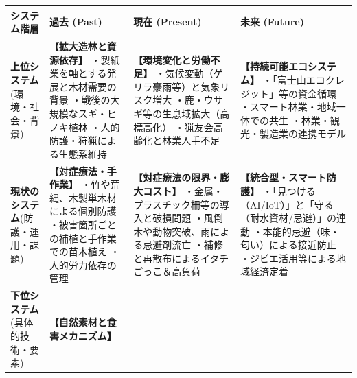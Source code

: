 \documentclass[uplatex, 11pt, a4paper]{bxjsarticle}
\begin{document}
\begin{table}[h]
\centering
\small
\renewcommand{\arraystretch}{1.4}
\begin{tabular}{|p{2.8cm}|p{4.2cm}|p{4.2cm}|p{4.2cm}|}
\hline
\rowcolor{primary}
\color{white}\textbf{システム階層} & \color{white}\textbf{過去 (Past)} & \color{white}\textbf{現在 (Present)} & \color{white}\textbf{未来 (Future)} \\ \hline
\rowcolor{bglight}
\textbf{上位システム}\newline (環境・社会・背景) & 
\textbf{【拡大造林と資源依存】}\newline
・製紙業を軸とする発展と木材需要の背景\newline
・戦後の大規模なスギ・ヒノキ植林\newline
・人的防護・狩猟による生態系維持 & 
\textbf{【環境変化と労働不足】}\newline
・気候変動（ゲリラ豪雨等）と気象リスク増大\newline
・鹿・ウサギ等の生息域拡大（高標高化）\newline
・猟友会高齢化と林業人手不足 & 
\textbf{【持続可能エコシステム】}\newline
・「富士山エコクレジット」等の資金循環\newline
・スマート林業・地域一体での共生\newline
・林業・観光・製造業の連携モデル \\ \hline
\textbf{現状のシステム}\newline (防護・運用・課題) & 
\textbf{【対症療法・手作業】}\newline
・竹や荒縄、木製単木材による個別防護\newline
・被害箇所ごとの補植と手作業での苗木植え\newline
・人的労力依存の管理 & 
\textbf{【対症療法の限界・膨大コスト】}\newline
・金属・プラスチック柵等の導入と破損問題\newline
・風倒木や動物突破、雨による忌避剤流亡\newline
・補修と再散布によるイタチごっこ＆高負荷 & 
\textbf{【統合型・スマート防護】}\newline
・「見つける（AI/IoT）」と「守る（耐水資材/忌避）」の連動\newline
・本能的忌避（味・匂い）による接近防止\newline
・ジビエ活用等による地域経済定着 \\ \hline
\rowcolor{bglight}
\textbf{下位システム}\newline (具体的技術・要素) & 
\textbf{【自然素材と食害メカニズム】}\newline

\end{tabular}
\end{table}
\end{document}
